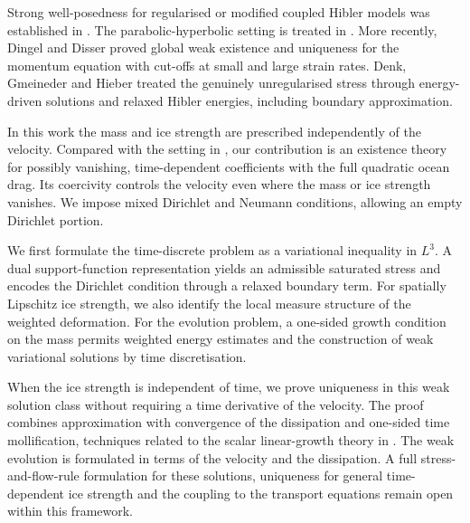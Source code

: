 \documentclass{article}
\theoremstyle{definition}
\begin{document}
Strong well-posedness for regularised or modified coupled Hibler models was
established in \cite{BDHH22,LTT22}. The parabolic-hyperbolic setting is treated
in \cite{B25}. More recently, Dingel and Disser \cite{DD25} proved global weak
existence and uniqueness for the momentum equation with cut-offs at small
and large strain rates. Denk, Gmeineder and Hieber \cite{DGH25} treated the
genuinely unregularised stress through energy-driven solutions and relaxed
Hibler energies, including boundary approximation.

In this work the mass and ice strength are prescribed independently of the
velocity. Compared with the setting in \cite{DGH25}, our contribution is an
existence theory for possibly vanishing, time-dependent coefficients with the
full quadratic ocean drag. Its coercivity controls the velocity even where
the mass or ice strength vanishes. We impose mixed Dirichlet and Neumann
conditions, allowing an empty Dirichlet portion.

We first formulate the time-discrete problem as a variational inequality in
$L^3$. A dual support-function representation yields an admissible saturated
stress and encodes the Dirichlet condition through a relaxed boundary term.
For spatially Lipschitz ice strength, we also identify the local measure
structure of the weighted deformation. For the evolution problem, a one-sided
growth condition on the mass permits weighted energy estimates and the
construction of weak variational solutions by time discretisation.

When the ice strength is independent of time, we prove uniqueness in this
weak solution class without requiring a time derivative of the velocity.
The proof combines approximation with convergence of the dissipation and
one-sided time mollification, techniques related to the scalar linear-growth
theory in \cite{E25}. The weak evolution is formulated in terms of the
velocity and the dissipation. A full stress-and-flow-rule formulation for
these solutions, uniqueness for general time-dependent ice strength and the
coupling to the transport equations remain open within this framework.
\end{document}
